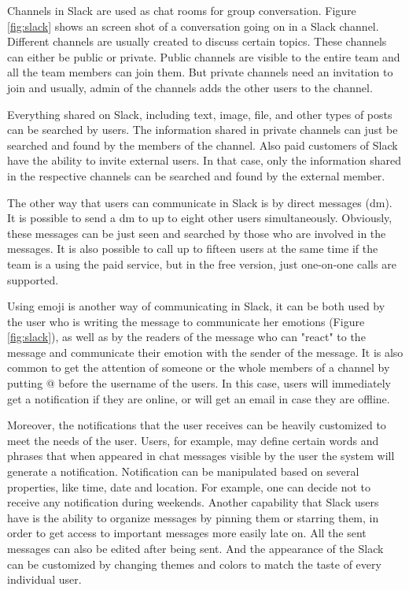 Channels in Slack are used as chat rooms for group conversation. Figure \ref{fig:slack} shows an screen shot of a conversation going on in a Slack channel. Different channels are usually created to discuss certain topics. These channels can either be public or private. Public channels are visible to the entire team and all the team members can join them. But private channels need an invitation to join and usually, admin of the channels adds the other users to the channel.
 
Everything shared on Slack, including text, image, file, and other types of posts can be searched by users. The information shared in private channels can just be searched and found by the members of the channel. Also paid customers of Slack have the ability to invite external users. In that case, only the information shared in the respective channels can be searched and found by the external member.

The other way that users can communicate in Slack is by direct messages (\ac{dm}). It is possible to send a \ac{dm} to up to eight other users simultaneously. Obviously, these messages can be just seen and searched by those who are involved in the messages. It is also possible to call up to fifteen users at the same time if the team is a using the paid service, but in the free version, just one-on-one calls are supported. 

Using emoji is another way of communicating in Slack, it can be both used by the user who is writing the message to communicate her emotions (Figure \ref{fig:slack}), as well as by the readers of the message who can "react" to the message and communicate their emotion with the sender of the message. It is also common to get the attention of someone or the whole members of a channel by putting @ before the username of the users. In this case, users will immediately get a notification if they are online, or will get an email in case they are offline.

Moreover, the notifications that the user receives can be heavily customized to meet the needs of the user. Users, for example, may define certain words and phrases that when appeared in chat messages visible by the user the system will generate a notification. Notification can be manipulated based on several properties, like time, date and location. For example, one can decide not to receive any notification during weekends. Another capability that Slack users have is the ability to organize messages by pinning them or starring them, in order to get access to important messages more easily late on. All the sent messages can also be edited after being sent. And the appearance of the Slack can be customized by changing themes and colors to match the taste of every individual user. 

